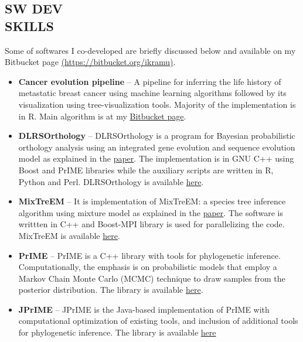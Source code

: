 \documentclass[margin, 10pt]{res} %
\begin{document}
\begin{resume}
\section{SW DEV \\SKILLS} 
Some of softwares I co-developed are briefly discussed below and available on my Bitbucket page \href{https://bitbucket.org/ikramu}{(https://bitbucket.org/ikramu)}.
\begin{itemize}
\item \textbf{Cancer evolution pipeline} -- A pipeline for inferring the life history of metastatic breast cancer using machine learning algorithms followed by its visualization using tree-visualization tools. Majority of the implementation is in R. Main algorithm is at my \href{https://bitbucket.org/ikramu/dolloparsimonyforcancerevolution}{Bitbucket page}. 
\item \textbf{DLRSOrthology} -- DLRSOrthology is a program for Bayesian probabilistic orthology analysis using an integrated gene evolution and sequence evolution model as explained in the \href{https://doi.org/10.1093/sysbio/syv044}{paper}. The implementation is in GNU C++ using Boost and PrIME libraries while the auxiliary scripts are written in R, Python and Perl. DLRSOrthology is available \href{https://bitbucket.org/ikramu/dlrsorthology}{here}.
\item \textbf{MixTreEM} -- It is implementation of MixTreEM: a species tree inference algorithm using mixture model as explained in the \href{https://doi.org/10.1093/molbev/msv115}{paper}. The software is writtten in C++ and Boost-MPI library is used for parallelizing the code. MixTreEM is available \href{https://bitbucket.org/ikramu/mixtreem}{here}.
\item \textbf{PrIME} -- PrIME is a C++ library with tools for phylogenetic inference. Computationally, the emphasis is on probabilistic models that employ a Markov Chain Monte Carlo (MCMC) technique to draw samples from the posterior distribution. The library is available \href{http://prime.scilifelab.se/}{here}.
\item \textbf{JPrIME} -- JPrIME is the Java-based implementation of PrIME with computational optimization of existing tools, and inclusion of additional tools for phylogenetic inference. The library is available \href{https://github.com/arvestad/jprime}{here}
\end{itemize}



\end{resume}
\end{document}
